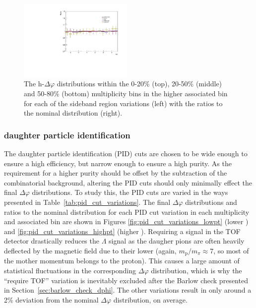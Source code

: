 \begin{figure}[ht]
    \includegraphics[width=0.49\textwidth]{figures/analysis/sideband_variations_dphi_50_80_highpt_ratio.pdf}
    \caption{The h-\lmb $\Delta\varphi$ distributions within the 0-20\% (top), 20-50\% (middle) and 50-80\% (bottom) multiplicity bins in the higher associated \pt bin for each of the sideband region variations (left) with the ratios to the nominal distribution (right).}
    \label{fig:sideband_region_variations_highpt}
\end{figure}

\subsubsection{\lmb daughter particle identification}
The \lmb daughter particle identification (PID) cuts are chosen to be wide enough to ensure a high efficiency, but narrow enough to ensure a high purity. As the requirement for a higher purity should be offset by the subtraction of the combinatorial background, altering the PID cuts should only minimally effect the final $\Delta\varphi$ distributions. To study this, the PID cuts are varied in the ways presented in Table~\ref{tab:pid_cut_variations}. The final $\Delta\varphi$ distributions and ratios to the nominal distribution for each PID cut variation in each multiplicity and associated \pt bin are shown in Figures \ref{fig:pid_cut_variations_lowpt} (lower \pt) and \ref{fig:pid_cut_variations_highpt} (higher \pt). Requiring a signal in the TOF detector drastically reduces the $\Lambda$ signal as the daugher pions are often heavily deflected by the magnetic field due to their lower \pt (again, $m_{\text{p}}/m_{\pi} \approx 7$, so most of the mother momentum belongs to the proton). This causes a large amount of statistical fluctuations in the corresponding $\Delta\varphi$ distribution, which is why the ``require TOF'' variation is inevitably excluded after the Barlow check presented in Section~\ref{sec:barlow_check_dphi}. The other variations result in only around a 2\% deviation from the nominal $\Delta\varphi$ distribution, on average.

